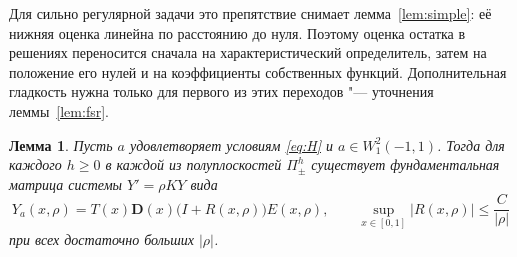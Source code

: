 \documentclass[12pt,a4paper]{article}
\numberwithin{equation}{section}
\newtheorem{lemma}{Лемма}
\theoremstyle{definition}
\newcommand{\abs}[1]{\lvert#1\rvert}
\newcommand{\Dd}{\mathbf D}
\begin{document}
Для сильно регулярной задачи это препятствие снимает
лемма~\ref{lem:simple}: её нижняя оценка линейна по расстоянию до нуля.
Поэтому оценка остатка в решениях переносится сначала на
характеристический определитель, затем на положение его нулей и на
коэффициенты собственных функций. Дополнительная гладкость нужна
только для первого из этих переходов "--- уточнения леммы~\ref{lem:fsr}.

\begin{lemma}\label{lem:fsr2}
Пусть $a$ удовлетворяет условиям \eqref{eq:H} и $a\in W^2_1(-1,1)$. Тогда для каждого $h\ge0$ в
каждой из полуплоскостей $\Pi^h_\pm$ существует фундаментальная матрица системы $Y'=\rho KY$ вида
\[
 Y_a(x,\rho)=T(x)\Dd(x)\bigl(I+R(x,\rho)\bigr)E(x,\rho),\qquad
 \sup_{x\in[0,1]}\abs{R(x,\rho)}\le\frac{C}{\abs\rho}
\]
при всех достаточно больших $\abs\rho$.
\end{lemma}
\end{document}
